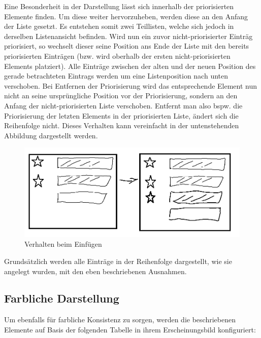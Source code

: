 Eine Besonderheit in der Darstellung lässt sich innerhalb der priorisierten Elemente finden. Um diese weiter hervorzuheben, werden diese an den Anfang der Liste gesetzt. Es entstehen somit zwei Teillisten, welche sich jedoch in derselben Listenansicht befinden. Wird nun ein zuvor nicht-priorisierter Einträg priorisiert, so wechselt dieser seine Position ans Ende der Liste mit den bereits priorisierten Einträgen (bzw. wird oberhalb der ersten nicht-priorisierten Elements platziert). Alle Einträge zwischen der alten und der neuen Position des gerade betrachteten Eintrags werden um eine Listenposition nach unten verschoben. Bei Entfernen der Priorisierung wird das entsprechende Element nun nicht an seine ursprüngliche Position vor der Priorisierung, sondern an den Anfang der nicht-priorisierten Liste verschoben. Entfernt man also bspw. die Priorisierung der letzten Elements in der priorisierten Liste, ändert sich die Reihenfolge nicht. Dieses Verhalten kann vereinfacht in der untenstehenden Abbildung dargestellt werden.

\begin{figure}[h!]
	\includegraphics[width=\linewidth]{img/sketch_insert.png}
	\centering
	\caption{Verhalten beim Einfügen}
	\label{fig:inserttodo}
\end{figure}

Grundsätzlich werden alle Einträge in der Reihenfolge dargestellt, wie sie angelegt wurden, mit den eben beschriebenen Ausnahmen.


\subsection{Farbliche Darstellung}
Um ebenfalls für farbliche Konsistenz zu sorgen, werden die beschriebenen Elemente auf Basis der folgenden Tabelle in ihrem Erscheinungsbild konfiguriert:

